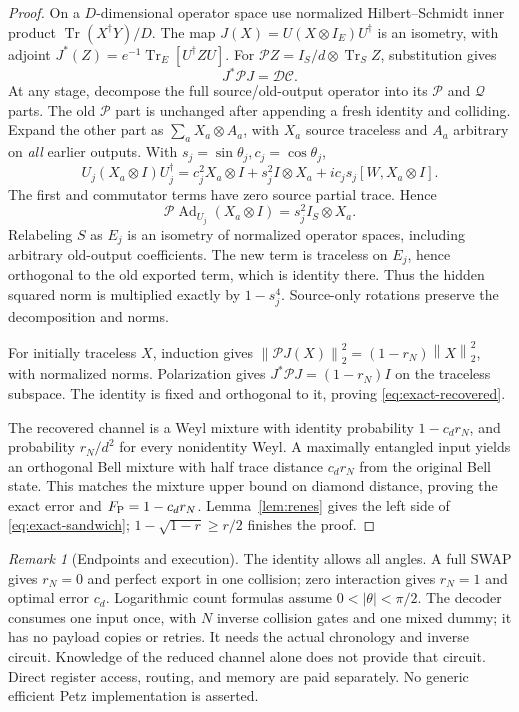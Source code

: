 \documentclass[11pt]{article}
\numberwithin{equation}{section}
\theoremstyle{remark}
\newtheorem{remark}[theorem]{Remark}
\newcommand{\Tr}{\operatorname{Tr}}
\newcommand{\Ad}{\operatorname{Ad}}
\newcommand{\Ccal}{\mathcal C}
\newcommand{\Dcal}{\mathcal D}
\newcommand{\Pcal}{\mathcal P}
\newcommand{\Qcal}{\mathcal Q}
\newcommand{\norm}[1]{\left\lVert#1\right\rVert}
\begin{document}
\begin{proof}
On a \(D\)-dimensional operator space use normalized Hilbert--Schmidt
inner product \(\Tr(X^\dagger Y)/D\). The map
\(J(X)=U(X\otimes I_E)U^\dagger\) is an isometry, with adjoint
\(J^*(Z)=e^{-1}\Tr_E[U^\dagger ZU]\).
For \(\Pcal Z=I_S/d\otimes\Tr_SZ\), substitution gives
\begin{equation}
 J^*\Pcal J=\Dcal\Ccal.                         \label{eq:gram}
\end{equation}
At any stage, decompose the full source/old-output operator into its
\(\Pcal\) and \(\Qcal\) parts. The old \(\Pcal\) part is unchanged after
appending a fresh identity and colliding. Expand the other part as
\(\sum_a X_a\otimes A_a\), with \(X_a\) source traceless and \(A_a\) arbitrary
on \emph{all} earlier outputs. With \(s_j=\sin\theta_j,c_j=\cos\theta_j\),
\[
 U_j(X_a\otimes I)U_j^\dagger
 =c_j^2X_a\otimes I+s_j^2I\otimes X_a
                   +ic_js_j[W,X_a\otimes I].
\]
The first and commutator terms have zero source partial trace. Hence
\begin{equation}
 \Pcal\Ad_{U_j}(X_a\otimes I)=s_j^2 I_S\otimes X_a.
 \label{eq:exact-transfer}
\end{equation}
Relabeling \(S\) as \(E_j\) is an isometry of normalized operator spaces,
including arbitrary old-output coefficients. The new term is traceless on
\(E_j\), hence orthogonal to the old exported term, which is identity there.
Thus the hidden squared norm is multiplied exactly by \(1-s_j^4\).
Source-only rotations preserve the decomposition and norms.

For initially traceless \(X\), induction gives
\(\norm{\Pcal J(X)}_2^2=(1-r_N)\norm X_2^2\), with normalized norms.
Polarization gives \(J^*\Pcal J=(1-r_N)I\) on the traceless subspace.
The identity is fixed and orthogonal to it, proving
\eqref{eq:exact-recovered}.

The recovered channel is a Weyl mixture with identity probability
\(1-c_dr_N\), and probability \(r_N/d^2\) for every nonidentity Weyl.
A maximally entangled input yields an orthogonal Bell mixture with half
trace distance \(c_dr_N\) from the original Bell state. This matches the
mixture upper bound on diamond distance, proving the exact error and
\(F_{\rm P}=1-c_dr_N\). Lemma~\ref{lem:renes} gives the left side of
\eqref{eq:exact-sandwich}; \(1-\sqrt{1-r}\ge r/2\) finishes the proof.
\end{proof}

\begin{remark}[Endpoints and execution]
The identity allows all angles. A full SWAP gives \(r_N=0\) and perfect
export in one collision; zero interaction gives \(r_N=1\) and optimal error
\(c_d\). Logarithmic count formulas assume \(0<|\theta|<\pi/2\).
The decoder consumes one input once, with \(N\) inverse collision gates and
one mixed dummy; it has no payload copies or retries. It needs the actual
chronology and inverse circuit. Knowledge of the reduced channel alone does
not provide that circuit. Direct register access, routing, and memory are
paid separately. No generic efficient Petz implementation is asserted.
\end{remark}
\end{document}
